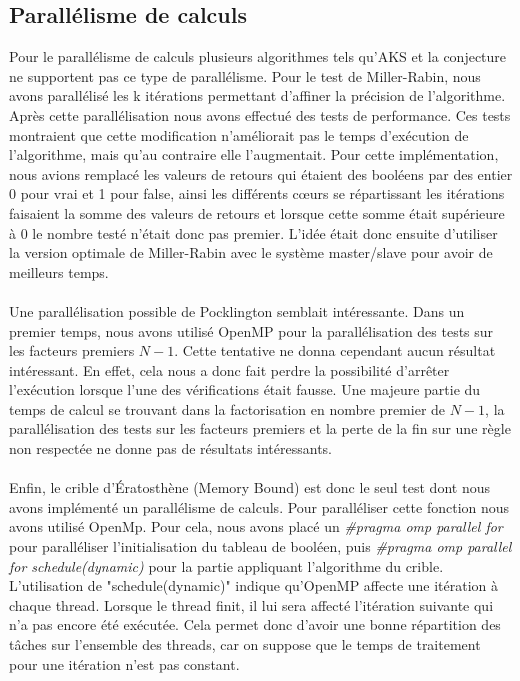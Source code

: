 		\subsection{Parallélisme de calculs}		
	Pour le parallélisme de calculs plusieurs algorithmes tels qu'AKS et la conjecture ne supportent pas ce type de parallélisme. Pour le test de Miller-Rabin, nous avons parallélisé les k itérations permettant d'affiner la précision de l'algorithme. Après cette parallélisation nous avons effectué des tests de performance. Ces tests montraient que cette modification n'améliorait pas le temps d'exécution de l'algorithme, mais qu'au contraire elle l'augmentait. Pour cette implémentation, nous avions remplacé les valeurs de retours qui étaient des booléens par des entier 0 pour vrai et 1 pour false, ainsi les différents cœurs se répartissant les itérations faisaient la somme des valeurs de retours et lorsque cette somme était supérieure à 0 le nombre testé n'était donc pas premier. L'idée était donc ensuite d'utiliser la version optimale de Miller-Rabin avec le système master/slave pour avoir de meilleurs temps.
	
	\paragraph{}Une parallélisation possible de Pocklington semblait intéressante. Dans un premier temps, nous avons utilisé OpenMP pour la parallélisation des tests sur les facteurs premiers $N-1$. Cette tentative ne donna cependant aucun résultat intéressant. En effet, cela nous a donc fait perdre la possibilité d'arrêter l'exécution lorsque l'une des vérifications était fausse. Une majeure partie du temps de calcul se trouvant dans la factorisation en nombre premier de $N-1$, la parallélisation des tests sur les facteurs premiers et la perte de la fin sur une règle non respectée ne donne pas de résultats intéressants. 
	
	\paragraph{}Enfin, le crible d’Ératosthène (Memory Bound) est donc le seul test dont nous avons implémenté un parallélisme de calculs. Pour paralléliser cette fonction nous avons utilisé OpenMp. Pour cela, nous avons placé un \textit{\#pragma omp parallel for} pour paralléliser l'initialisation du tableau de booléen, puis
\textit{\#pragma omp parallel for schedule(dynamic)}	pour la partie appliquant l'algorithme du crible. L'utilisation de "schedule(dynamic)" indique qu'OpenMP affecte une itération à chaque thread. Lorsque le thread finit, il lui sera affecté l’itération suivante qui n’a pas encore été exécutée. Cela permet donc d'avoir une bonne répartition des tâches sur l'ensemble des threads, car on suppose que le temps de traitement pour une itération n'est pas constant.
	
